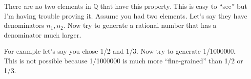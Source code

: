 \documentclass[twoside]{amsart}
\begin{document}
\begin{enumerate}[A.]
\begin{enumerate}[1]
      There are no two elements in $\mathbb{Q}$ that have this property.
      This is easy to ``see'' but I'm having trouble proving it. Assume
      you had two elements. Let's say they have denominators $n_1, n_2$.
      Now try to generate a rational number that has a denominator much
      larger.

      For example let's say you chose 1/2 and 1/3. Now try to generate
      1/1000000. This is not possible because 1/1000000 is much more
      ``fine-grained'' than 1/2 or 1/3.


   \end{enumerate}

\end{enumerate}
\end{document}
